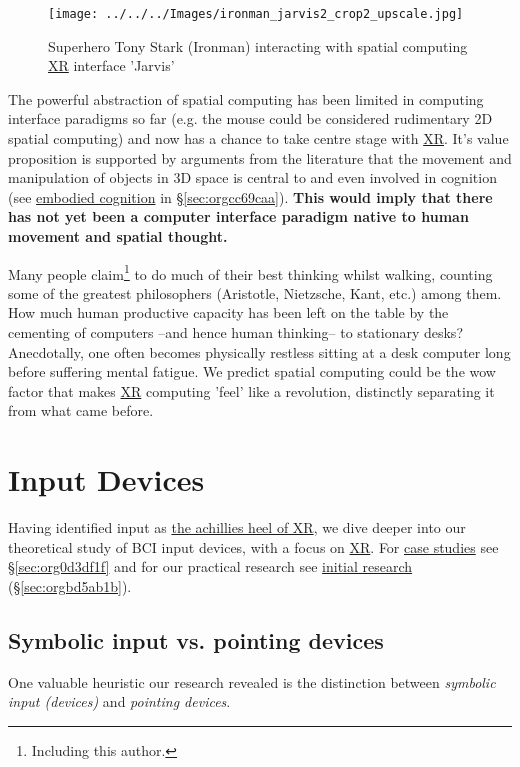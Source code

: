 \documentclass[logo,bsc,singlespacing,parskip]{infthesis}
\begin{document}
\begin{figure}[h]
\centering
\texttt{[image: ../../../Images/ironman\_jarvis2\_crop2\_upscale.jpg]}
\caption{Superhero Tony Stark (Ironman) interacting with spatial computing \hyperref[org1d567af]{XR} interface 'Jarvis'}
\end{figure}

The powerful abstraction of spatial computing has been limited in computing interface paradigms so far (e.g. the mouse could be considered rudimentary 2D spatial computing) and now has a chance to take centre stage with \hyperref[org1d567af]{XR}.
It's value proposition is supported by arguments from the literature that the movement and manipulation of objects in 3D space is central to and even involved in cognition (see \hyperref[orgcc8d0dd]{embodied cognition} in \S \ref{sec:orgcc69caa}).
\textbf{This would imply that there has not yet been a computer interface paradigm native to human movement and spatial thought.}

Many people claim\footnote{Including this author.} to do much of their best thinking whilst walking, counting some of the greatest philosophers (Aristotle, Nietzsche, Kant, etc.) among them.
How much human productive capacity has been left on the table by the cementing of computers --and hence human thinking-- to stationary desks?
Anecdotally, one often becomes physically restless sitting at a desk computer long before suffering mental fatigue.
We predict spatial computing could be the wow factor that makes \hyperref[org1d567af]{XR} computing 'feel' like a revolution, distinctly separating it from what came before.

\chapter{Input Devices}
\label{sec:orgfe71570}
Having identified input as \hyperref[sec:org978b247]{the achillies heel of XR}, we dive deeper into our theoretical study of BCI input devices, with a focus on \hyperref[org1d567af]{XR}.
For \hyperref[sec:org0d3df1f]{case studies} see \S \ref{sec:org0d3df1f} and for our practical research see \hyperref[sec:orgbd5ab1b]{initial research} (\S \ref{sec:orgbd5ab1b}).
\section{Symbolic input vs. pointing devices}
\label{sec:orgf9f3181}
One valuable heuristic our research revealed is the distinction between \emph{symbolic input (devices)} and \emph{pointing devices}.
\end{document}
